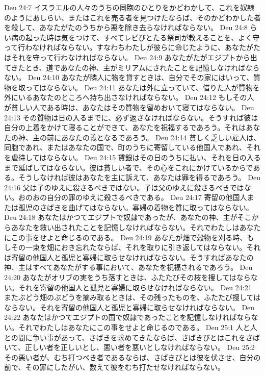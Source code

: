 Deu 24:7  イスラエルの人々のうちの同胞のひとりをかどわかして、これを奴隷のようにあしらい、またはこれを売る者を見つけたならば、そのかどわかした者を殺して、あなたがたのうちから悪を除き去らなければならない。
Deu 24:8  らい病の起った時は気をつけて、すべてレビびとたる祭司が教えることを、よく守って行わなければならない。すなわちわたしが彼らに命じたように、あなたがたはそれを守って行わなければならない。
Deu 24:9  あなたがたがエジプトから出てきたとき、道であなたの神、主がミリアムにされたことを記憶しなければならない。
Deu 24:10  あなたが隣人に物を貸すときは、自分でその家にはいって、質物を取ってはならない。
Deu 24:11  あなたは外に立っていて、借りた人が質物を外にいるあなたのところへ持ち出さなければならない。
Deu 24:12  もしその人が貧しい人である時は、あなたはその質物を留めおいて寝てはならない。
Deu 24:13  その質物は日の入るまでに、必ず返さなければならない。そうすれば彼は自分の上着をかけて寝ることができて、あなたを祝福するであろう。それはあなたの神、主の前にあなたの義となるであろう。
Deu 24:14  貧しく乏しい雇人は、同胞であれ、またはあなたの国で、町のうちに寄留している他国人であれ、それを虐待してはならない。
Deu 24:15  賃銀はその日のうちに払い、それを日の入るまで延ばしてはならない。彼は貧しい者で、その心をこれにかけているからである。そうしなければ彼はあなたを主に訴えて、あなたは罪を得るであろう。
Deu 24:16  父は子のゆえに殺さるべきではない。子は父のゆえに殺さるべきではない。おのおの自分の罪のゆえに殺さるべきである。
Deu 24:17  寄留の他国人または孤児のさばきを曲げてはならない。寡婦の着物を質に取ってはならない。
Deu 24:18  あなたはかつてエジプトで奴隷であったが、あなたの神、主がそこからあなたを救い出されたことを記憶しなければならない。それでわたしはあなたにこの事をせよと命じるのである。
Deu 24:19  あなたが畑で穀物を刈る時、もしその一束を畑におき忘れたならば、それを取りに引き返してはならない。それは寄留の他国人と孤児と寡婦に取らせなければならない。そうすればあなたの神、主はすべてあなたがする事において、あなたを祝福されるであろう。
Deu 24:20  あなたがオリブの実をうち落すときは、ふたたびその枝を捜してはならない。それを寄留の他国人と孤児と寡婦に取らせなければならない。
Deu 24:21  またぶどう畑のぶどうを摘み取るときは、その残ったものを、ふたたび捜してはならない。それを寄留の他国人と孤児と寡婦に取らせなければならない。
Deu 24:22  あなたはかつてエジプトの国で奴隷であったことを記憶しなければならない。それでわたしはあなたにこの事をせよと命じるのである。
Deu 25:1  人と人との間に争い事があって、さばきを求めてきたならば、さばきびとはこれをさばいて、正しい者を正しいとし、悪い者を悪いとしなければならない。
Deu 25:2  その悪い者が、むち打つべき者であるならば、さばきびとは彼を伏させ、自分の前で、その罪にしたがい、数えて彼をむち打たせなければならない。
